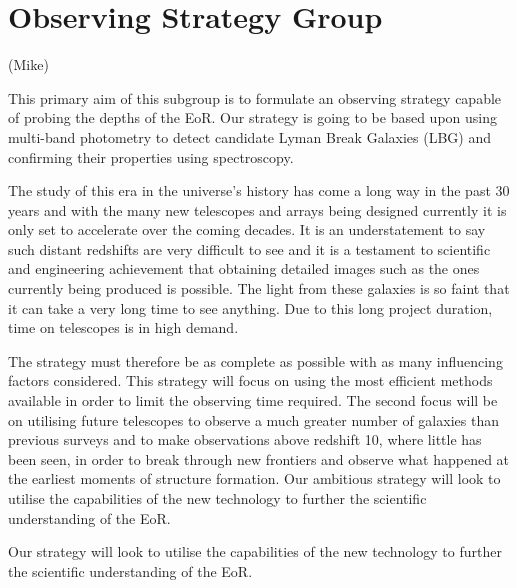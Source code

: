 \section{Observing Strategy Group} %
\label{sec:observing_strategy_group}
(Mike)

	This primary aim of this subgroup is to formulate an observing strategy capable of probing the depths of the EoR. Our strategy is going to be based upon using multi-band photometry to detect candidate Lyman Break Galaxies (LBG) and confirming their properties using spectroscopy.

	The study of this era in the universe's history has come a long way in the past 30 years and with the many new telescopes and arrays being designed currently it is only set to accelerate over the coming decades. It is an understatement to say such distant redshifts are very difficult to see and it is a testament to scientific and engineering achievement that obtaining detailed images such as the ones currently being produced is possible. The light from these galaxies is so faint that it can take a very long time to see anything. Due to this long project duration, time on telescopes is in high demand.

	The strategy must therefore be as complete as possible with as many influencing factors considered. This strategy will focus on using the most efficient methods available in order to limit the observing time required. The second focus will be on utilising future telescopes to observe a much greater number of galaxies than previous surveys and to make observations above redshift 10, where little has been seen, in order to break through new frontiers and observe what happened at the earliest moments of structure formation. Our ambitious strategy will look to utilise the capabilities of the new technology to further the scientific understanding of the EoR.

	Our strategy will look to utilise the capabilities of the new technology to further the scientific understanding of the EoR.

